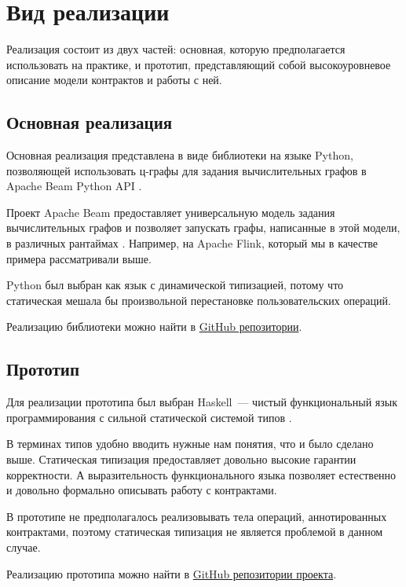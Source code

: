 \section{Вид реализации}

Реализация состоит из двух частей: основная, которую предполагается использовать на практике, и прототип, представляющий собой высокоуровневое описание модели контрактов и работы с ней.

\subsection{Основная реализация}

Основная реализация представлена в виде библиотеки на языке Python, позволяющей использовать ц-графы для задания вычислительных графов в Apache Beam Python API \cite{beam-py}.

Проект Apache Beam предоставляет универсальную модель задания вычислительных графов и позволяет запускать графы, написанные в этой модели, в различных рантаймах \cite{beam}. Например, на Apache Flink, который мы в качестве примера рассматривали выше.

Python был выбран как язык с динамической типизацией, потому что статическая мешала бы произвольной перестановке пользовательских операций.

Реализацию библиотеки можно найти в \href{https://github.com/flame-stream/calco/tree/master/calco}{GitHub репозитории}.

\subsection{Прототип}

Для реализации прототипа был выбран Haskell~--- чистый функциональный язык программирования с сильной статической системой типов \cite{haskell}.

В терминах типов удобно вводить нужные нам понятия, что и было сделано выше.
Статическая типизация предоставляет довольно высокие гарантии корректности.
А выразительность функционального языка позволяет естественно и довольно формально описывать работу с контрактами.

В прототипе не предполагалось реализовывать тела операций, аннотированных контрактами, поэтому статическая типизация не является проблемой в данном случае.

Реализацию прототипа можно найти в \href{https://github.com/flame-stream/calco/tree/master/calcohs}{GitHub репозитории проекта}.
